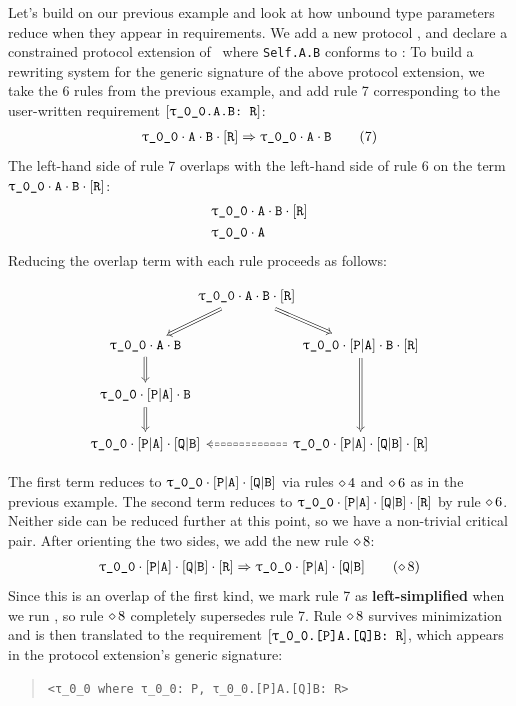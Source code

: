 \documentclass[../generics]{subfiles}
\begin{document}
\begin{example}\label{overlap of first kind example}
Let's build on our previous example and look at how unbound type parameters reduce when they appear in requirements. We add a new protocol \tR, and declare a constrained protocol extension of \tP\ where \texttt{Self.A.B} conforms to \tR:
To build a rewriting system for the generic signature of the above protocol extension, we take the 6 rules from the previous example, and add rule 7 corresponding to the user-written requirement $\ConfReq{\rT.A.B}{R}$:
\begin{gather*}
\ProtoConf{\rT\cdot\nA\cdot\nB}{R}\tag{7}
\end{gather*}
The left-hand side of rule 7 overlaps with the left-hand side of rule 6 on the term $\rT\cdot\nA\cdot\nB\cdot\pR$:
\begin{align*}
&\rT\cdot\nA\cdot\nB\cdot\pR\\
&\rT\cdot\nA
\end{align*}
Reducing the overlap term with each rule proceeds as follows:
\begin{ceqn}
\[
\begin{tikzcd}[column sep=-1em]
& \rT \cdot \nA \cdot \nB \cdot \pR\arrow[ld, Rightarrow]\arrow[rd, Rightarrow] \\
\rT \cdot \nA \cdot \nB\arrow[d, Rightarrow] && \rT \cdot \aPA \cdot \nB \cdot \pR\arrow[dd, Rightarrow] \\
\rT \cdot \aPA \cdot \nB\arrow[d, Rightarrow] \\
\rT \cdot \aPA \cdot \aQB && \rT \cdot \aPA \cdot \aQB \cdot \pR\arrow[ll, dashed, Rightarrow]
\end{tikzcd}
\]
\end{ceqn}
The first term reduces to $\rT \cdot \aPA \cdot \aQB$ via rules $\diamond\, 4$ and $\diamond\, 6$ as in the previous example. The second term reduces to $\rT \cdot \aPA \cdot \aQB \cdot \pR$ by rule $\diamond\, 6$. Neither side can be reduced further at this point, so we have a non-trivial critical pair. After orienting the two sides, we add the new rule $\diamond\, 8$:
\begin{gather*}
\ProtoConf{\rT\cdot\aPA\cdot\aQB}{R}\tag{$\CRule{8}$}
\end{gather*}
Since this is an overlap of the first kind, we mark rule 7 as \textbf{left-simplified} when we run , so rule $\diamond\, 8$ completely supersedes rule 7. Rule $\diamond\, 8$ survives minimization and is then translated to the requirement $\ConfReq{\rT.[P]A.[Q]B}{R}$, which appears in the protocol extension's generic signature:
\begin{quote}
\begin{verbatim}
<τ_0_0 where τ_0_0: P, τ_0_0.[P]A.[Q]B: R>
\end{verbatim}
\end{quote}


\end{example}
\end{document}
